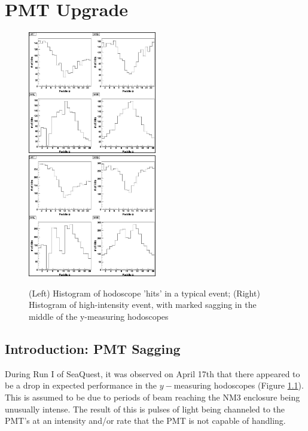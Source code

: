 \chapter{PMT Upgrade}


\begin{figure}
	\centerline{
		\mbox{\includegraphics[width=0.5\textwidth]{figures/nosag.jpg} \includegraphics[width=0.5\textwidth]{figures/sag.jpg}}
	}
	\caption{(Left) Histogram of hodoscope 'hits' in a typical event; (Right) Histogram of high-intensity event, with marked sagging in the middle of the y-measuring hodoscopes}
	\label{fig:sag}
\end{figure}

\section{Introduction: PMT Sagging}

During Run I of SeaQuest, it was observed on April 17th that there appeared to be a drop in expected performance in the $y-$measuring hodoscopes (Figure \ref{fig:sag}). This is assumed to be due to periods of beam reaching the NM3 enclosure being unusually intense. The result of this is pulses of light being channeled to the PMT's at an intensity and/or rate that the PMT is not capable of handling.

